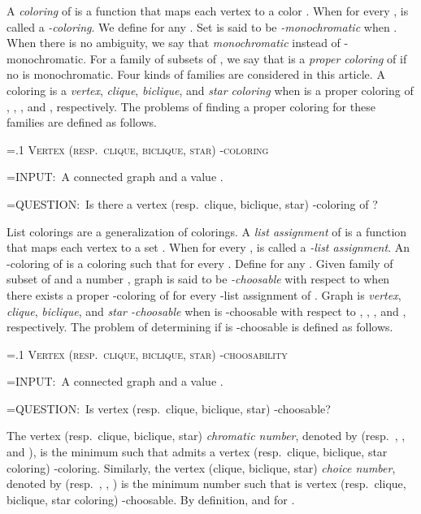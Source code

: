\documentclass[a4paper, 11pt, oneside]{article}
\newenvironment{Problem}{\begin{Sbox}\begin{minipage}{\textwidth-2\parindent}\parskip=.1\baselineskip \vspace{.25\baselineskip}}{\vspace{.25\baselineskip}\end{minipage}\end{Sbox}\vspace{\baselineskip}\begin{center}\doublebox{\TheSbox}\end{center}\vspace{\baselineskip}}
\newcommand{\problemName}[1]{\noindent#1\vspace{.5\baselineskip}}
\newcommand{\InputTag}{\textsf{INPUT:}\ }
\newlength{\InputLength}\settowidth{\InputLength}{\InputTag}
\newcommand{\problemInput}[1]{\hangindent=\InputLength\InputTag #1}
\newcommand{\QuestionTag}{\textsf{QUESTION:}\ }
\newlength{\QuestionLength}\settowidth{\QuestionLength}{\QuestionTag}
\newcommand{\problemQuestion}[1]{\hangindent=\QuestionLength\QuestionTag #1}
\let\Definition=\emph
\begin{document}
A \Definition{coloring} of  is a function  that maps each vertex  to a color .  When  for every ,  is called a \Definition{-coloring}.  We define  for any .  Set  is said to be \Definition{-monochromatic} when .  When there is no ambiguity, we say that  \Definition{monochromatic} instead of -monochromatic.  For a family  of subsets of , we say that  is a \Definition{proper coloring} of  if no  is monochromatic.  Four kinds of families are considered in this article.  A coloring  is a \Definition{vertex}, \Definition{clique}, \Definition{biclique}, and \Definition{star coloring} when  is a proper coloring of , , , and , respectively.  The problems of finding a proper coloring for these families are defined as follows.

\begin{Problem}
  \problemName{\textsc{Vertex (resp.\ clique, biclique, star) -coloring}}

  \problemInput{A connected graph  and a value .}

  \problemQuestion{Is there a vertex (resp.\ clique, biclique, star) -coloring of ?}
\end{Problem}

List colorings are a generalization of colorings. A \Definition{list assignment} of  is a function that maps each vertex  to a set .  When  for every ,  is called a \Definition{-list assignment}.  An -coloring of  is a coloring  such that  for every .  Define  for any .  Given family  of subset of  and a number , graph  is said to be \Definition{-choosable} with respect to  when there exists a proper -coloring of  for every -list assignment  of .  Graph  is \Definition{vertex}, \Definition{clique}, \Definition{biclique}, and \Definition{star -choosable} when  is -choosable with respect to , , , and , respectively.  The problem of determining if  is -choosable is defined as follows.

\begin{Problem}
  \problemName{\textsc{Vertex (resp.\ clique, biclique, star) -choosability}}

  \problemInput{A connected graph  and a value .}

  \problemQuestion{Is  vertex (resp.\ clique, biclique, star) -choosable?}
\end{Problem}

The vertex (resp.\ clique, biclique, star) \Definition{chromatic number}, denoted by  (resp.\ , , and ), is the minimum  such that  admits a vertex (resp.\ clique, biclique, star coloring) -coloring. Similarly, the vertex (clique, biclique, star) \Definition{choice number}, denoted by  (resp.\ , , ) is the minimum number  such that  is vertex (resp.\ clique, biclique, star coloring) -choosable.  By definition,  and  for .  
\end{document}
